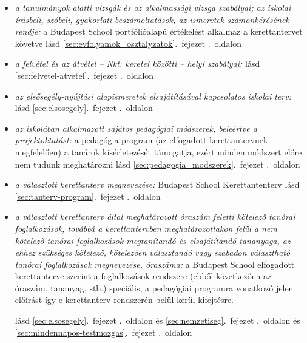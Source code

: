 \begin{itemize}
\item \emph{a tanulmányok alatti vizsgák és az alkalmassági vizsga szabályai; az iskolai írásbeli, szóbeli, gyakorlati beszámoltatások, az ismeretek számonkérésének rendje: }   a Budapest School portfólióalapú értékelést alkalmaz a kerettantervet követve 
       lásd        \ref{sec:evfolyamok_osztalyzatok}.~fejezet .~oldalon
              
\item \emph{a felvétel és az átvétel -- Nkt. keretei közötti -- helyi szabályai: }    
       lásd        \ref{sec:felvetel-atvetel}.~fejezet .~oldalon
              
\item \emph{az elsősegély-nyújtási alapismeretek elsajátításával kapcsolatos iskolai terv: }    
       lásd        \ref{sec:elsosegely}.~fejezet .~oldalon
              
\item \emph{az iskolában alkalmazott sajátos pedagógiai módszerek, beleértve a projektoktatást: }   a pedagógia program (az elfogadott kerettantervnek megfelelően) a tanárok kísérletezését támogatja, ezért minden módszert előre nem tudunk meghatározni 
       lásd        \ref{sec:pedagogia_modszerek}.~fejezet .~oldalon
              
\item \emph{a választott kerettanterv megnevezése: }   Budapest School Kerettantenterv 
       lásd        \ref{sec:tanterv-program}.~fejezet .~oldalon
              
\item \emph{a választott kerettanterv által meghatározott óraszám feletti kötelező tanórai foglalkozások, továbbá a kerettantervben meghatározottakon felül a nem kötelező tanórai foglalkozások megtanítandó és elsajátítandó tananyaga, az ehhez szükséges kötelező, kötelezően választandó vagy szabadon választható tanórai foglalkozások megnevezése, óraszáma: }   a Budapest School elfogadott kerettanterve szerint a foglalkozások rendszere (ebből következően az óraszám, tananyag, stb.) speciális, a pedagógiai programra vonatkozó jelen előírást így e kerettanterv rendszerén belül kerül kifejtésre.
 
       lásd        \ref{sec:elsosegely}.~fejezet .~oldalon és 
              \ref{sec:nemzetiseg}.~fejezet .~oldalon és 
              \ref{sec:mindennapos-testmozgas}.~fejezet .~oldalon
              

\end{itemize}
